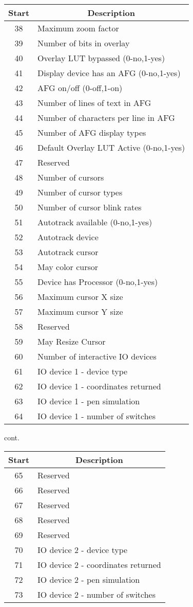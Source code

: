 \begin{tabular}{|c|l|}
\hline
\multicolumn{1}{|c|}{Start}
&\multicolumn{1}{|c|}{Description}\\ \hline
38 & Maximum zoom factor\\
39 & Number of bits in overlay\\
40 & Overlay LUT bypassed (0-no,1-yes)\\
41 & Display device has an AFG  (0-no,1-yes)\\
42 & AFG on/off  (0-off,1-on)\\
43 & Number of lines of text in AFG\\
44 & Number of characters per line in AFG\\
45 & Number of AFG display types\\
46 & Default Overlay LUT Active (0-no,1-yes)\\
47 & Reserved\\
48 & Number of cursors\\
49 & Number of cursor types\\
50 & Number of cursor blink rates\\
51 & Autotrack available (0-no,1-yes)\\
52 & Autotrack device\\
53 & Autotrack cursor\\
54 & May color cursor\\
55 & Device has Processor (0-no,1-yes)\\
56 & Maximum cursor X size\\
57 & Maximum cursor Y size\\
58 & Reserved\\
59 & May Resize Cursor\\
60 & Number of interactive IO devices\\
61 & IO device 1 - device type\\
62 & IO device 1 - coordinates returned\\
63 & IO device 1 - pen simulation\\
64 & IO device 1 - number of switches\\ \hline
\end{tabular}
\newpage
cont.

\begin{tabular}{|c|l|}
\hline
\multicolumn{1}{|c|}{Start}
&\multicolumn{1}{|c|}{Description}\\
\hline
65 & Reserved\\
66 & Reserved\\
67 & Reserved\\
68 & Reserved\\
69 & Reserved\\
70 & IO device 2 - device type\\
71 & IO device 2 - coordinates returned\\
72 & IO device 2 - pen simulation\\
73 & IO device 2 - number of switches\\ \hline
\end{tabular}
\cleardoublepage
